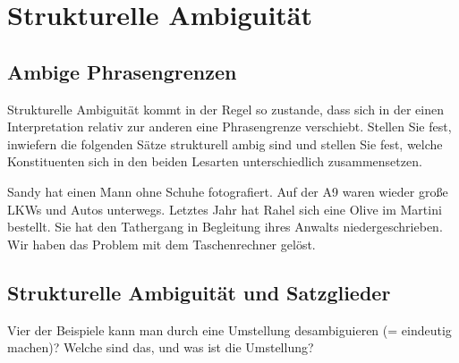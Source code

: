 \section{Strukturelle Ambiguität}

\subsection{Ambige Phrasengrenzen}

Strukturelle Ambiguität kommt in der Regel so zustande, dass sich in der einen Interpretation relativ zur anderen eine Phrasengrenze verschiebt.
Stellen Sie fest, inwiefern die folgenden Sätze strukturell ambig sind und stellen Sie fest, welche Konstituenten sich in den beiden Lesarten unterschiedlich zusammensetzen.

\begin{exe}
  \ex Sandy hat einen Mann ohne Schuhe fotografiert.
  \ex Auf der A9 waren wieder große LKWs und Autos unterwegs.
  \ex Letztes Jahr hat Rahel sich eine Olive im Martini bestellt.
  \ex Sie hat den Tathergang in Begleitung ihres Anwalts niedergeschrieben.
  \ex Wir haben das Problem mit dem Taschenrechner gelöst.
\end{exe}

\subsection{Strukturelle Ambiguität und Satzglieder}

Vier der Beispiele kann man durch eine Umstellung desambiguieren (= eindeutig machen)?
Welche sind das, und was ist die Umstellung?

\newpage
\hspace{1em}
\newpage
\hspace{1em}

